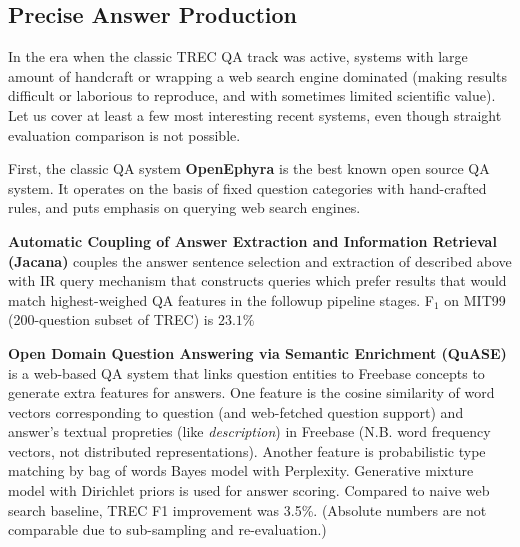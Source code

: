 \subsection{Precise Answer Production}

In the era when the classic TREC QA track was active,
systems with large amount of handcraft \cite{LCC}
or wrapping a web search engine \cite{AskMSR} dominated
(making results difficult or laborious to reproduce,
and with sometimes limited scientific value).
Let us cover at least a few most interesting recent systems,
even though straight evaluation comparison is not possible.


First, the classic QA system \textbf{OpenEphyra} \citep{Ephyra2006}
is the best known open source QA system.
It operates on the basis of fixed question categories with hand-crafted rules,
and puts emphasis on querying web search engines.

\textbf{Automatic Coupling of Answer Extraction and Information Retrieval (Jacana)} \citep{TreeEditIR2013Yao}
couples the answer sentence selection and extraction of \cite{TreeEdit2013Yao}
described above with IR query mechanism that constructs queries
which prefer results that would match highest-weighed QA features
in the followup pipeline stages.
F$_1$ on MIT99 (200-question subset of TREC) is $23.1\%$


\textbf{Open Domain Question Answering via Semantic Enrichment (QuASE)} \citep{QuASE}
	is a web-based QA system that links question entities to Freebase concepts
	to generate extra features for answers.
	One feature is the cosine similarity of word
	vectors corresponding to question (and web-fetched question support)
	and answer's textual propreties (like \textit{description}) in Freebase
	(N.B. word frequency vectors, not distributed representations).
	Another feature is probabilistic type matching by bag of words Bayes model
	with Perplexity.  Generative mixture model with Dirichlet priors is used
	for answer scoring.  Compared to naive web search baseline, TREC F1
	improvement was 3.5\%.  (Absolute numbers are not comparable due to
	sub-sampling and re-evaluation.)


